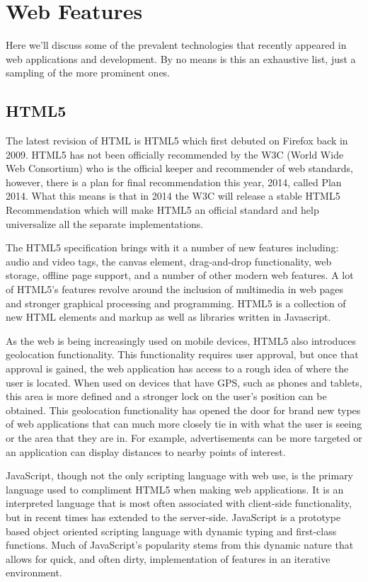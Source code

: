 \documentclass[12pt]{ucthesis}
\begin{document}
\section{Web Features}
Here we'll discuss some of the prevalent technologies that recently appeared in web applications and development. By no means is this an exhaustive list, just a sampling of the more prominent ones.

\subsection{HTML5}
The latest revision of HTML is HTML5 which first debuted on Firefox back in 2009. \cite{EvolutionOfWeb} HTML5 has not been officially recommended by the W3C (World Wide Web Consortium) who is the official keeper and recommender of web standards, however, there is a plan for final recommendation this year, 2014, called Plan 2014. \cite{Plan2014} What this means is that in 2014 the W3C will release a stable HTML5 Recommendation which will make HTML5 an official standard and help universalize all the separate implementations.

The HTML5 specification brings with it a number of new features including: audio and video tags, the canvas element, drag-and-drop functionality, web storage, offline page support, and a number of other modern web features. A lot of HTML5's features revolve around the inclusion of multimedia in web pages and stronger graphical processing and programming. HTML5 is a collection of new HTML elements and markup as well as libraries written in Javascript.

As the web is being increasingly used on mobile devices, HTML5 also introduces geolocation functionality. This functionality requires user approval, but once that approval is gained, the web application has access to a rough idea of where the user is located. When used on devices that have GPS, such as phones and tablets, this area is more defined and a stronger lock on the user's position can be obtained. This geolocation functionality has opened the door for brand new types of web applications that can much more closely tie in with what the user is seeing or the area that they are in. For example, advertisements can be more targeted or an application can display distances to nearby points of interest.

JavaScript, though not the only scripting language with web use, is the primary language used to compliment HTML5 when making web applications. It is an interpreted language that is most often associated with client-side functionality, but in recent times has extended to the server-side. JavaScript is a prototype based object oriented scripting language with dynamic typing and first-class functions. Much of JavaScript's popularity stems from this dynamic nature that allows for quick, and often dirty, implementation of features in an iterative environment.
\end{document}
